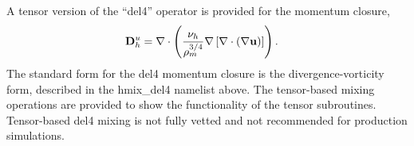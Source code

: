 A tensor version of the ``del4'' operator is provided for the momentum closure,
\begin{eqnarray}
\label{ocean:h_mom_del4_tensor}
& {\bf D}^u_h = \nabla\cdot\left( 
   \displaystyle\frac{\nu_h}{\rho_m^{3/4}} \nabla 
\left[
\nabla\cdot \left(
   \displaystyle \nabla {\bf u} \right)  \right]
  \right).
\end{eqnarray}
The standard form for the del4 momentum closure is the divergence-vorticity form, described in the hmix\_del4 namelist above.  The tensor-based mixing operations are provided to show the functionality of the tensor subroutines.  Tensor-based del4 mixing is not fully vetted and not recommended for production simulations.
